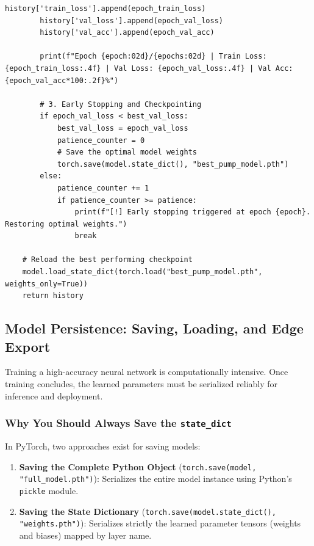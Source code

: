 \begin{lstlisting}[style=pythonstyle, caption={Complete production-grade PyTorch training and validation loop.}, label={lst:full_training_loop}]
        history['train_loss'].append(epoch_train_loss)
        history['val_loss'].append(epoch_val_loss)
        history['val_acc'].append(epoch_val_acc)

        print(f"Epoch {epoch:02d}/{epochs:02d} | Train Loss: {epoch_train_loss:.4f} | Val Loss: {epoch_val_loss:.4f} | Val Acc: {epoch_val_acc*100:.2f}%")

        # 3. Early Stopping and Checkpointing
        if epoch_val_loss < best_val_loss:
            best_val_loss = epoch_val_loss
            patience_counter = 0
            # Save the optimal model weights
            torch.save(model.state_dict(), "best_pump_model.pth")
        else:
            patience_counter += 1
            if patience_counter >= patience:
                print(f"[!] Early stopping triggered at epoch {epoch}. Restoring optimal weights.")
                break

    # Reload the best performing checkpoint
    model.load_state_dict(torch.load("best_pump_model.pth", weights_only=True))
    return history
\end{lstlisting}

\subsection{Model Persistence: Saving, Loading, and Edge Export}\label{subsec:saving_loading}

Training a high-accuracy neural network is computationally intensive. Once training concludes, the learned parameters must be serialized reliably for inference and deployment.

\subsubsection{Why You Should Always Save the \texttt{state\_dict}}

In PyTorch, two approaches exist for saving models:
\begin{enumerate}
    \item \textbf{Saving the Complete Python Object} (\texttt{torch.save(model, "full\_model.pth")}): Serializes the entire model instance using Python's \texttt{pickle} module.
    \item \textbf{Saving the State Dictionary} (\texttt{torch.save(model.state\_dict(), "weights.pth")}): Serializes strictly the learned parameter tensors (weights and biases) mapped by layer name.
\end{enumerate}

